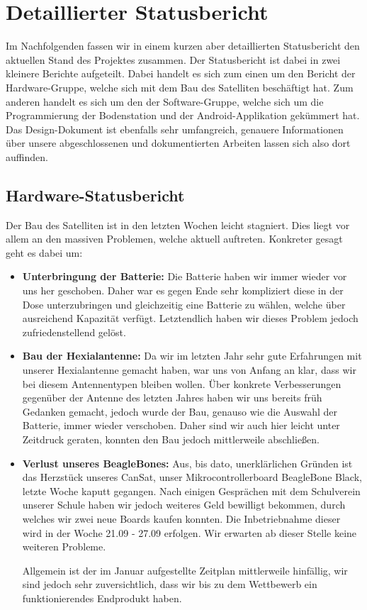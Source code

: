 \section{Detaillierter Statusbericht}
Im Nachfolgenden fassen wir in einem kurzen aber detaillierten Statusbericht den aktuellen Stand des Projektes zusammen. Der Statusbericht ist dabei in zwei kleinere Berichte aufgeteilt. Dabei handelt es sich zum einen um den Bericht der Hardware-Gruppe, welche sich mit dem Bau des Satelliten beschäftigt hat. Zum anderen handelt es sich um den der Software-Gruppe, welche sich um die Programmierung der Bodenstation und der Android-Applikation gekümmert hat. Das Design-Dokument ist ebenfalls sehr umfangreich, genauere Informationen über unsere abgeschlossenen und dokumentierten Arbeiten lassen sich also dort auffinden.

\subsection{Hardware-Statusbericht}
Der Bau des Satelliten ist in den letzten Wochen leicht stagniert. Dies liegt vor allem an den massiven Problemen, welche aktuell auftreten. Konkreter gesagt geht es dabei um:

\begin{itemize}
\item \textbf{Unterbringung der Batterie:} Die Batterie haben wir immer wieder vor uns her geschoben. Daher war es gegen Ende sehr kompliziert diese in der Dose unterzubringen und gleichzeitig eine Batterie zu wählen, welche über ausreichend Kapazität verfügt. Letztendlich haben wir dieses Problem jedoch zufriedenstellend gelöst.
\item \textbf{Bau der Hexialantenne:} Da wir im letzten Jahr sehr gute Erfahrungen mit unserer Hexialantenne gemacht haben, war uns von Anfang an klar, dass wir bei diesem Antennentypen bleiben wollen. Über konkrete Verbesserungen gegenüber der Antenne des letzten Jahres haben wir uns bereits früh Gedanken gemacht, jedoch wurde der Bau, genauso wie die Auswahl der Batterie, immer wieder verschoben. Daher sind wir auch hier leicht unter Zeitdruck geraten, konnten den Bau jedoch mittlerweile abschließen.
\item \textbf{Verlust unseres BeagleBones:} Aus, bis dato, unerklärlichen Gründen ist das Herzstück unseres CanSat, unser Mikrocontrollerboard BeagleBone Black, letzte Woche kaputt gegangen. Nach einigen Gesprächen mit dem Schulverein unserer Schule haben wir jedoch weiteres Geld bewilligt bekommen, durch welches wir zwei neue Boards kaufen konnten. Die Inbetriebnahme dieser wird in der Woche 21.09 - 27.09 erfolgen. Wir erwarten ab dieser Stelle keine weiteren Probleme.

Allgemein ist der im Januar aufgestellte Zeitplan mittlerweile hinfällig, wir sind jedoch sehr zuversichtlich, dass wir bis zu dem Wettbewerb ein funktionierendes Endprodukt haben.

\end{itemize}
